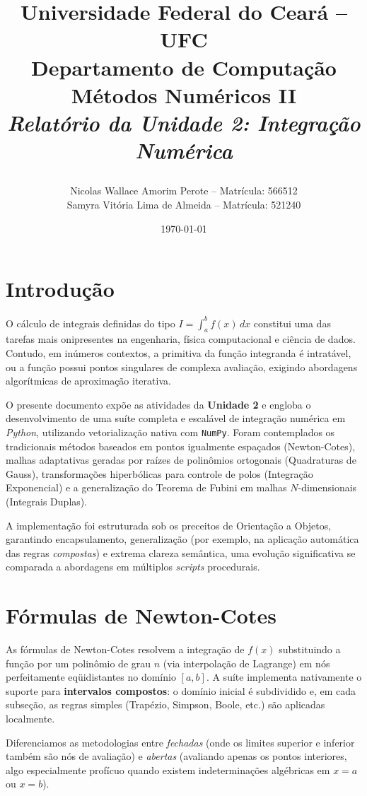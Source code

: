 \documentclass[12pt,a4paper]{article}
\title{
    \vspace{-1cm}
    \begin{center}
        \Large \textbf{Universidade Federal do Ceará -- UFC} \\
        \large Departamento de Computação \\
        \vspace{1cm}
        \Huge \textbf{Métodos Numéricos II} \\
        \vspace{0.5cm}
        \Large \textit{Relatório da Unidade 2: Integração Numérica}
    \end{center}
}
\author{
    Nicolas Wallace Amorim Perote -- Matrícula: 566512 \\
    Samyra Vitória Lima de Almeida -- Matrícula: 521240
}
\date{\today}
\begin{document}
\maketitle
\tableofcontents
\newpage

\section{Introdução}
O cálculo de integrais definidas do tipo $I = \int_a^b f(x)\,dx$ constitui uma das tarefas mais onipresentes na engenharia, física computacional e ciência de dados. Contudo, em inúmeros contextos, a primitiva da função integranda é intratável, ou a função possui pontos singulares de complexa avaliação, exigindo abordagens algorítmicas de aproximação iterativa.

O presente documento expõe as atividades da \textbf{Unidade 2} e engloba o desenvolvimento de uma suíte completa e escalável de integração numérica em \textit{Python}, utilizando vetorialização nativa com \texttt{NumPy}. Foram contemplados os tradicionais métodos baseados em pontos igualmente espaçados (Newton-Cotes), malhas adaptativas geradas por raízes de polinômios ortogonais (Quadraturas de Gauss), transformações hiperbólicas para controle de polos (Integração Exponencial) e a generalização do Teorema de Fubini em malhas $N$-dimensionais (Integrais Duplas).

A implementação foi estruturada sob os preceitos de Orientação a Objetos, garantindo encapsulamento, generalização (por exemplo, na aplicação automática das regras \textit{compostas}) e extrema clareza semântica, uma evolução significativa se comparada a abordagens em múltiplos \textit{scripts} procedurais.

\section{Fórmulas de Newton-Cotes}
As fórmulas de Newton-Cotes resolvem a integração de $f(x)$ substituindo a função por um polinômio de grau $n$ (via interpolação de Lagrange) em nós perfeitamente eqüidistantes no domínio $[a, b]$. A suíte implementa nativamente o suporte para \textbf{intervalos compostos}: o domínio inicial é subdividido e, em cada subseção, as regras simples (Trapézio, Simpson, Boole, etc.) são aplicadas localmente.

Diferenciamos as metodologias entre \textit{fechadas} (onde os limites superior e inferior também são nós de avaliação) e \textit{abertas} (avaliando apenas os pontos interiores, algo especialmente profícuo quando existem indeterminações algébricas em $x=a$ ou $x=b$).
\end{document}
